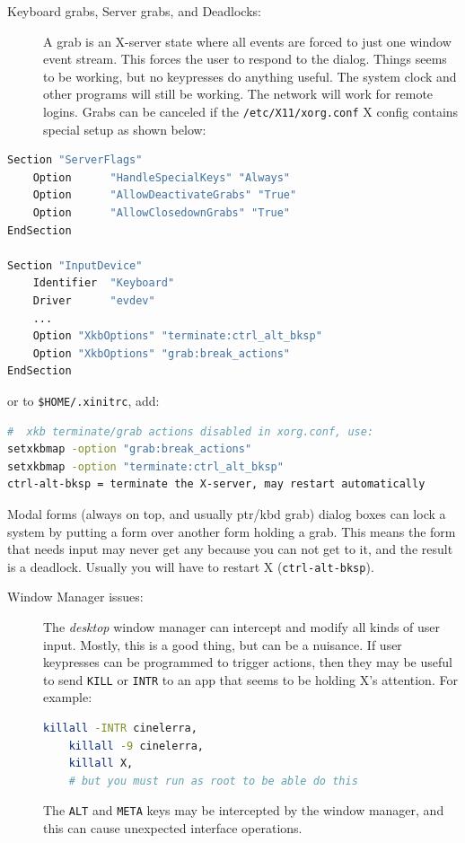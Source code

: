 \begin{description}
	\item[Keyboard grabs, Server grabs, and Deadlocks:] A grab is an X-server state where all events are forced to just one window event stream.  This forces the user to respond to the dialog.  Things seems to be working, but no keypresses do anything useful. The system clock and other programs will still be working.  The network will work for remote logins. Grabs can be canceled if the \texttt{/etc/X11/xorg.conf} X config contains special setup as shown below:
\end{description}

\begin{lstlisting}[language=bash,numbers=none]
Section "ServerFlags"
	Option      "HandleSpecialKeys" "Always"
	Option      "AllowDeactivateGrabs" "True"
	Option      "AllowClosedownGrabs" "True"
EndSection

Section "InputDevice"
	Identifier  "Keyboard"
	Driver      "evdev"
	...
	Option "XkbOptions" "terminate:ctrl_alt_bksp"
	Option "XkbOptions" "grab:break_actions"
EndSection
\end{lstlisting}

or to \texttt{\$HOME/.xinitrc}, add:

\begin{lstlisting}[language=bash,numbers=none]
#  xkb terminate/grab actions disabled in xorg.conf, use:	
setxkbmap -option "grab:break_actions"
setxkbmap -option "terminate:ctrl_alt_bksp"
ctrl-alt-bksp = terminate the X-server, may restart automatically
\end{lstlisting}


Modal forms (always on top, and usually ptr/kbd grab) dialog boxes can lock a system by putting a form over another form holding a grab.  This means the form that needs input may never get any because you can not get to it, and the result is a deadlock.  Usually you will have to restart X (\texttt{ctrl-alt-bksp}).

\begin{description}
	\item[Window Manager issues:] The \textit{desktop} window manager can intercept and modify all kinds of user input.  Mostly, this is a good thing, but can be a nuisance.  If user keypresses can be programmed to trigger actions, then they may be useful to send \texttt{KILL} or \texttt{INTR} to an app that seems to be holding X's attention.  For example:
	\begin{lstlisting}[language=bash,numbers=none]
	killall -INTR cinelerra,
	killall -9 cinelerra,	
	killall X,
	# but you must run as root to be able do this
	\end{lstlisting}
	The \texttt{ALT} and \texttt{META} keys may be intercepted by the window manager, and this can cause unexpected interface operations.
\end{description}

